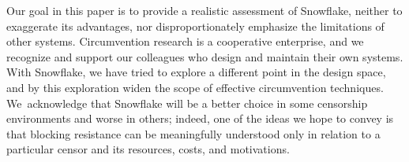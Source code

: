 \documentclass[letterpaper,twocolumn]{article}
\begin{document}

Our goal in this paper is to provide a realistic assessment of Snowflake,
neither to exaggerate its advantages,
nor disproportionately emphasize the limitations
of other systems.
Circumvention research is a cooperative enterprise,
and we recognize and support our colleagues who
design and maintain their own systems.
With Snowflake, we have tried to explore a different point in the design space,
and by this exploration widen the scope of effective circumvention techniques.
We~acknowledge that Snowflake will be a better choice in some
censorship environments and
worse in others; indeed,
one of the ideas we hope to convey
is that blocking resistance
can be meaningfully understood only in relation to a particular censor
and its resources, costs, and motivations.
\end{document}
